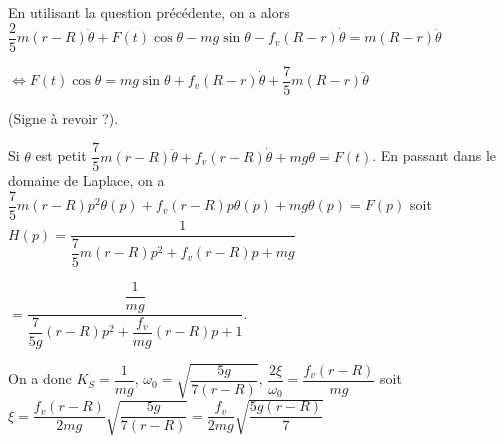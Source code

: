 En utilisant la question précédente, on a alors 
$\dfrac{2}{5}m(r-R)\ddot{\theta}+F(t)\cos\theta-mg\sin\theta -f_v \left(R-r\right)\dot{\theta} =  m(R-r)\ddot{\theta}$

$\Longleftrightarrow F(t)\cos\theta = mg\sin\theta  + f_v \left(R-r\right)\dot{\theta} + \dfrac{7}{5}m(R-r)\ddot{\theta}$

(Signe à revoir ?).
\else
\fi


\ifprof
Si $\theta$ est petit $\dfrac{7}{5}m\left(r-R\right)\ddot{\theta} +f_v\left(r-R\right)\dot{\theta}+mg\theta=F(t)$. 
En passant dans le domaine de Laplace, on a $\dfrac{7}{5}m\left(r-R\right)p^2{\theta(p)} +f_v\left(r-R\right)p {\theta(p)}+mg\theta(p)=F(p)$
soit $H(p)=\dfrac{1}{\dfrac{7}{5}m\left(r-R\right)p^2 +f_v\left(r-R\right)p +mg}$

$ = \dfrac{\dfrac{1}{mg}}{\dfrac{7}{5g}\left(r-R\right)p^2 +\dfrac{f_v}{mg}\left(r-R\right)p +1}$.

On a donc $K_S = \dfrac{1}{mg}$, $\omega_0 = \sqrt{\dfrac{5g}{7\left(r-R\right)}}$,
$\dfrac{2 \xi }{\omega_0} = \dfrac{f_v\left(r-R\right)}{mg}$ soit $\xi =\dfrac{f_v\left(r-R\right)}{2mg}\sqrt{\dfrac{5g}{7\left(r-R\right)}} =\dfrac{f_v}{2mg}\sqrt{\dfrac{5g\left(r-R\right)}{7}} $

\else
\fi


\ifprof
\else


\fi